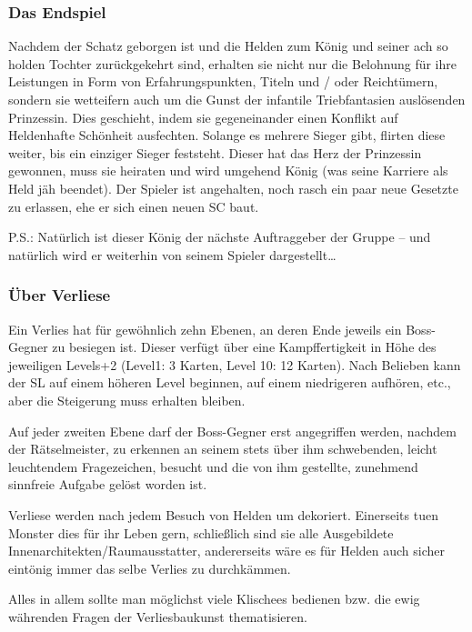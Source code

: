  
\subsubsection{Das Endspiel}

Nachdem der Schatz geborgen ist und die Helden zum König und seiner ach so holden Tochter zurückgekehrt sind, erhalten sie nicht nur die Belohnung für ihre Leistungen in Form von Erfahrungspunkten, Titeln und / oder Reichtümern, sondern sie wetteifern auch um die Gunst der infantile Triebfantasien auslösenden Prinzessin. Dies geschieht, indem sie gegeneinander einen Konflikt auf Heldenhafte Schönheit ausfechten. Solange es mehrere Sieger gibt, flirten diese weiter, bis ein einziger Sieger feststeht. Dieser hat das Herz der Prinzessin gewonnen, muss sie heiraten und wird umgehend König (was seine Karriere als Held jäh beendet). Der Spieler ist angehalten, noch rasch ein paar neue Gesetzte zu erlassen, ehe er sich einen neuen SC baut.

P.S.: Natürlich ist dieser König der nächste Auftraggeber der Gruppe -- und natürlich wird er weiterhin von seinem Spieler dargestellt\dots

 
\subsubsection{Über Verliese}

Ein Verlies hat für gewöhnlich zehn Ebenen, an deren Ende jeweils ein Boss-Gegner zu besiegen ist. Dieser verfügt über eine Kampffertigkeit in Höhe des jeweiligen Levels+2 (Level1: 3 Karten, Level 10: 12 Karten). Nach Belieben kann der SL auf einem höheren Level beginnen, auf einem niedrigeren aufhören, etc., aber die Steigerung muss erhalten bleiben.

Auf jeder zweiten Ebene darf der Boss-Gegner erst angegriffen werden, nachdem der Rätselmeister\texttrademark, zu erkennen an seinem stets über ihm schwebenden, leicht leuchtendem Fragezeichen, besucht und die von ihm gestellte, zunehmend sinnfreie Aufgabe gelöst worden ist.

Verliese werden nach jedem Besuch von Helden um dekoriert. Einerseits tuen Monster dies für ihr Leben gern, schließlich sind sie alle Ausgebildete Innenarchitekten/Raumausstatter, andererseits wäre es für Helden auch sicher eintönig immer das selbe Verlies zu durchkämmen.

Alles in allem sollte man möglichst viele Klischees bedienen bzw. die ewig währenden Fragen der Verliesbaukunst thematisieren.

